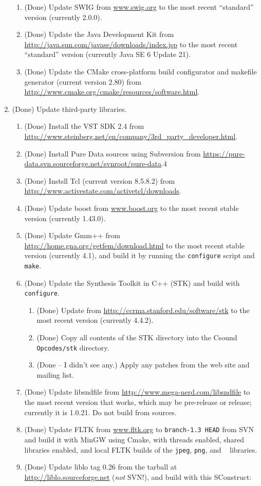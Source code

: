\documentclass[11pt,letterpaper,onecolumn]{scrartcl}
\begin{document}
\begin{sloppypar}
\begin{enumerate}
\begin{enumerate}
	    \item (Done) Update SWIG from \url{www.swig.org} to the most recent ``standard'' version (currently 2.0.0).
	    \item (Done) Update the Java Development Kit from \url{http://java.sun.com/javase/downloads/index.jsp} to the most recent ``standard'' version (currently Java SE 6 Update 21).
	    \item (Done) Update the CMake cross-platform build configurator and makefile generator (current version 2.80) from \url{http://www.cmake.org/cmake/resources/software.html}.
		\end{enumerate}    
	\item (Done) Update third-party libraries.   
		\begin{enumerate}
    	\item (Done) Install the VST SDK 2.4 from \url{http://www.steinberg.net/en/company/3rd_party_developer.html}.
    	\item (Done) Install Pure Data sources using Subversion from \url{https://pure-data.svn.sourceforge.net/svnroot/pure-data}.4
    	\item (Done) Instsll Tcl (current version 8.5.8.2) from \url{http://www.activestate.com/activetcl/downloads}.
   		\item (Done) Update boost from \url{www.boost.org} to the most recent stable version (currently 1.43.0).
  		\item (Done) Update Gmm++ from \url{http://home.gna.org/getfem/download.html} to the most recent stable version (currently 4.1), and build it by running the \texttt{configure} script and \texttt{make}.
    	\item (Done) Update the Synthesis Toolkit in C++ (STK) and build with \texttt{configure}.
				\begin{enumerate}
					\item (Done) Update from \url{http://ccrma.stanford.edu/software/stk} to the most recent version (currently 4.4.2). 
					\item (Done) Copy all contents of the STK directory into the Csound \texttt{Opcodes/stk} directory.
					\item (Done -- I didn't see any.) Apply any patches from the web site and mailing list. 
				\end{enumerate}   	
			\item (Done) Update libsndfile from \url{http://www.mega-nerd.com/libsndfile} to the most recent version that works, which may be pre-release or release; currently it is 1.0.21. Do not build from sources. 
    	\item (Done) Update FLTK from \url{www.fltk.org} to \texttt{branch-1.3 HEAD} from SVN and build it with MinGW using Cmake, with threads enabled, shared libraries enabled, and local FLTK builds of the \texttt{jpeg}, \texttt{png}, and \texttt{	} libraries. 
     	\item (Done) Update liblo tag 0.26 from the tarball at \url{http://liblo.sourceforge.net} (\emph{not} SVN!), and build with this SConstruct:
    	

\end{enumerate}
\end{enumerate}
\end{sloppypar}
\end{document}
